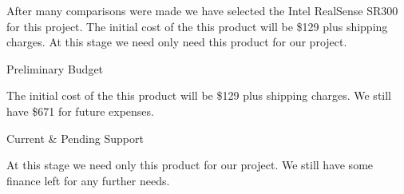 
After many comparisons were made we have selected the Intel RealSense SR300 for this project. The initial cost of the this product will be \$129 plus shipping charges. At this stage we need only need this product for our project.

{Preliminary Budget}

The initial cost of the this product will be \$129 plus shipping charges. We still have \$671 for future expenses.

{Current \& Pending Support}

At this stage we need only this product for our project. We still have some finance left for any further needs.

